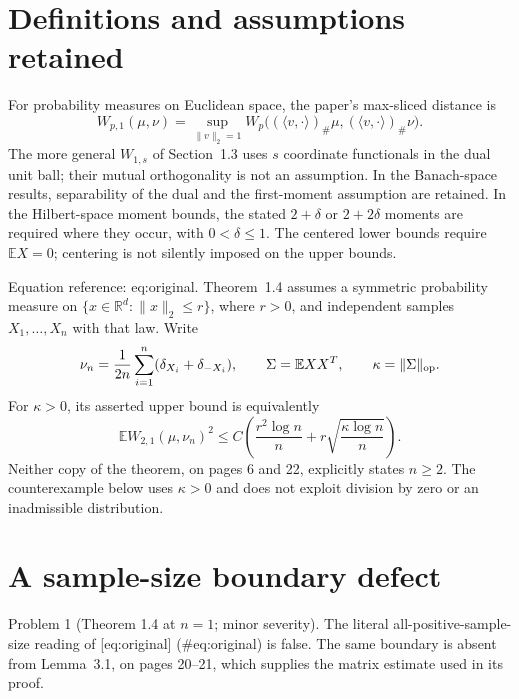 \documentclass[10pt]{article}
\begin{document}
\section*{Definitions and assumptions retained}
For probability measures on Euclidean space, the paper’s max-sliced distance is \[W_{p,1}(\mu,\nu)=
 \sup_{\|v\|_2=1}W_p\bigl((\langle v,\cdot\rangle)_\#\mu,
                         (\langle v,\cdot\rangle)_\#\nu\bigr).\] The more general \(W_{1,s}\) of Section 1.3 uses \(s\) coordinate functionals in the dual unit ball; their mutual orthogonality is not an assumption. In the Banach-space results, separability of the dual and the first-moment assumption are retained. In the Hilbert-space moment bounds, the stated \(2+\delta\) or \(2+2\delta\) moments are required where they occur, with \(0<\delta\leq1\). The centered lower bounds require \(\mathbb E X=0\); centering is not silently imposed on the upper bounds.\par
Equation reference: eq:original. Theorem 1.4 assumes a symmetric probability measure on \(\{x\in\mathbb R^d:\|x\|_2\leq r\}\), where \(r>0\), and independent samples \(X_1,\ldots,X_n\) with that law. Write \[\nu_n=\frac1{2n}\sum_{i=1}^n(\delta_{X_i}+\delta_{-X_i}),
 \qquad
 \Sigma=\mathbb E XX^{T},\qquad \kappa=\|\Sigma\|_{\rm op}.\] For \(\kappa>0\), its asserted upper bound is equivalently \[
 \mathbb E W_{2,1}(\mu,\nu_n)^2
 \leq C\left(\frac{r^2\log n}{n}
       +r\sqrt{\frac{\kappa\log n}{n}}\right).\] Neither copy of the theorem, on pages 6 and 22, explicitly states \(n\geq2\). The counterexample below uses \(\kappa>0\) and does not exploit division by zero or an inadmissible distribution.\par
\section*{A sample-size boundary defect}
Problem 1 (Theorem 1.4 at \(n=1\); minor severity).  The literal all-positive-sample-size reading of [eq:original] (\#eq:original) is false. The same boundary is absent from Lemma 3.1, on pages 20–21, which supplies the matrix estimate used in its proof.\par
\end{document}
